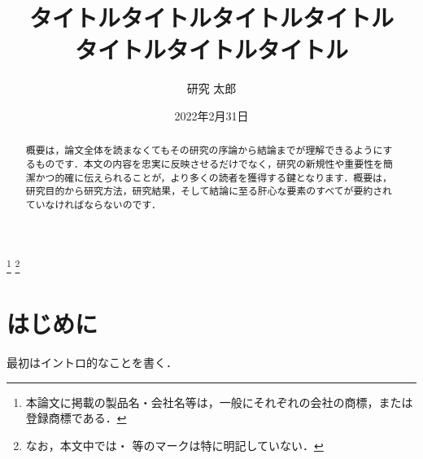 \documentclass[a4paper,11pt,uplatex]{ujreport}
\title{タイトルタイトルタイトルタイトル\\タイトルタイトルタイトル}  %
\author{研究 太郎}  %
\date{2022年2月31日}  %
\begin{document}
\maketitle
\clearpage

\begin{abstract}
  概要は，論文全体を読まなくてもその研究の序論から結論までが理解できるようにするものです．本文の内容を忠実に反映させるだけでなく，研究の新規性や重要性を簡潔かつ的確に伝えられることが，より多くの読者を獲得する鍵となります．概要は，研究目的から研究方法，研究結果，そして結論に至る肝心な要素のすべてが要約されていなければならないのです．
\end{abstract}


\footnote[0]{本論文に掲載の製品名・会社名等は，一般にそれぞれの会社の商標，または登録商標である．}
\footnote[0]{なお，本文中では\texttrademark ・ \textregistered 等のマークは特に明記していない．}


\setcounter{page}{0}

\tableofcontents

\clearpage


\chapter{はじめに}
\label{chap:Introduction}

最初はイントロ的なことを書く．\par
\end{document}
